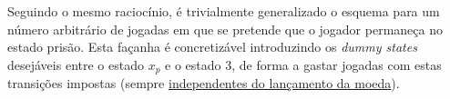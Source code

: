 Seguindo o mesmo raciocínio, é trivialmente generalizado o esquema para um número arbitrário de jogadas em que se pretende que o jogador permaneça no estado prisão. Esta façanha é concretizável introduzindo os \textit{dummy states} desejáveis entre o estado $x_p$ e o estado $3$, de forma a gastar jogadas com estas transições impostas (sempre \underline{independentes do lançamento da moeda}). 

\iffalse
\noindent Complementa-se o diagrama com a matriz de transição $\pmb{P}$ respetiva:
$$
\pmb{P}=
    \begin{bmatrix}
        0 & 0.5 & 0.5 & 0 & 0 & 0 & 0 & 0\\
        0 & 0 & 0.5 & 0.5 & 0 & 0 & 0 & 0\\
        0 & 0 & 0 & 0.5 & 0.5 & 0 & 0 & 0\\
        0 & 0 & 0 & 0 & 0.5 & 0.5 & 0 & 0\\
        0 & 0 & 0 & 0 & 0 & 0.5 & 0 & 0.5\\
        0 & 0 & 0 & 0 & 0 & 0 & 0.5 & 0.5\\
        0.5 & 0.5 & 0 & 0 & 0 & 0 & 0 & 0\\
        0 & 0 & 1 & 0 & 0 & 0 & 0 & 0
    \end{bmatrix}
$$
\fi
